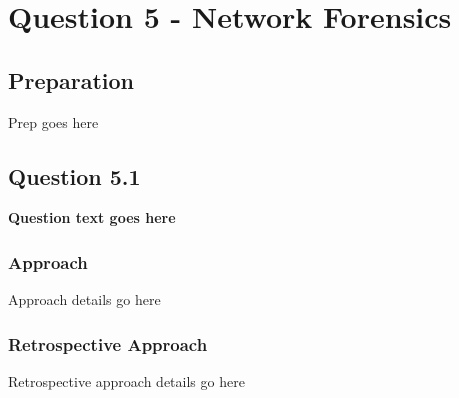 \chapter{Question 5 - Network Forensics}

\section{Preparation}
Prep goes here

\section{Question 5.1}
\textbf{Question text goes here}
\subsection{Approach}
Approach details go here
\subsection{Retrospective Approach}
Retrospective approach details go here
